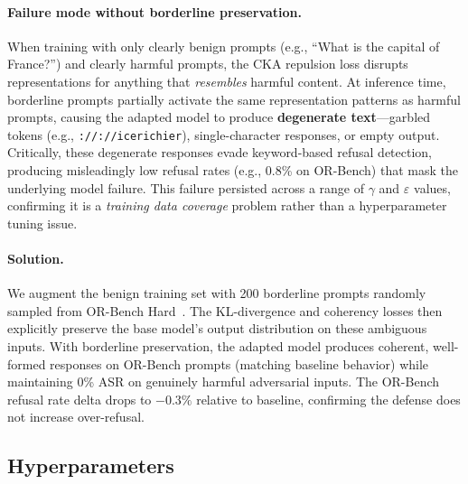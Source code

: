 \documentclass[11pt]{article}
\begin{document}
\paragraph{Failure mode without borderline preservation.}
When training with only clearly benign prompts (e.g., ``What is the capital of France?'') and clearly harmful prompts, the CKA repulsion loss disrupts representations for anything that \emph{resembles} harmful content. At inference time, borderline prompts partially activate the same representation patterns as harmful prompts, causing the adapted model to produce \textbf{degenerate text}---garbled tokens (e.g., \texttt{://://icerichier}), single-character responses, or empty output. Critically, these degenerate responses evade keyword-based refusal detection, producing misleadingly low refusal rates (e.g., 0.8\% on OR-Bench) that mask the underlying model failure. This failure persisted across a range of $\gamma$ and $\varepsilon$ values, confirming it is a \emph{training data coverage} problem rather than a hyperparameter tuning issue.

\paragraph{Solution.}
We augment the benign training set with 200 borderline prompts randomly sampled from OR-Bench Hard~\cite{orbench}. The KL-divergence and coherency losses then explicitly preserve the base model's output distribution on these ambiguous inputs. With borderline preservation, the adapted model produces coherent, well-formed responses on OR-Bench prompts (matching baseline behavior) while maintaining 0\% ASR on genuinely harmful adversarial inputs. The OR-Bench refusal rate delta drops to $-0.3\%$ relative to baseline, confirming the defense does not increase over-refusal.

\subsection{Hyperparameters}
\end{document}
